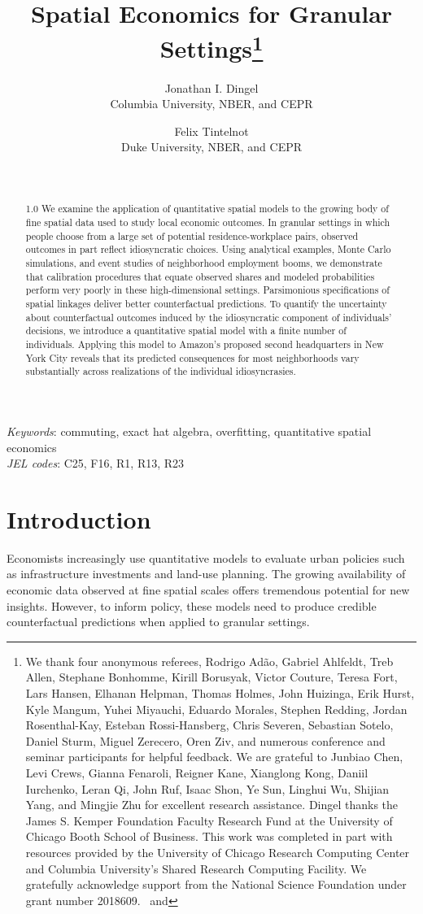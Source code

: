 \documentclass[11pt]{article}
\title{Spatial Economics for Granular Settings\thanks{
	We thank four anonymous referees,
	Rodrigo Ad\~{a}o, Gabriel Ahlfeldt, Treb Allen, Stephane Bonhomme, Kirill Borusyak, Victor Couture, Teresa Fort, Lars Hansen, Elhanan Helpman, Thomas Holmes, John Huizinga, Erik Hurst, Kyle Mangum, Yuhei Miyauchi, Eduardo Morales, Stephen Redding, Jordan Rosenthal-Kay, Esteban Rossi-Hansberg, Chris Severen, Sebastian Sotelo, Daniel Sturm, Miguel Zerecero, Oren Ziv, and
	numerous conference and seminar participants for helpful feedback.
	We are grateful to Junbiao Chen, Levi Crews, Gianna Fenaroli, Reigner Kane, Xianglong Kong, Daniil Iurchenko, Leran Qi, John Ruf, Isaac Shon, Ye Sun, Linghui Wu, Shijian Yang, and Mingjie Zhu for excellent research assistance.
	Dingel thanks the James S. Kemper Foundation Faculty Research Fund at the University of Chicago Booth School of Business.
	This work was completed in part with resources provided by the University of Chicago Research Computing Center
	and Columbia University's Shared Research Computing Facility.
	We gratefully acknowledge support from the National Science Foundation under grant number 2018609.
	\dingelemail \ and \tintelnotemail
}}
\author{Jonathan I. Dingel
\\ Columbia University, NBER, and CEPR
\and
Felix Tintelnot
\\ Duke University, NBER, and CEPR}
\date{\the\day \ \monthname[\the\month] \the\year}
\theoremstyle{definition}
\begin{document}
\maketitle 


\begin{abstract}
\begin{spacing}{1.0}
We examine the application of quantitative spatial models to the growing body of fine spatial data used to study local economic outcomes.
In granular settings in which people choose from a large set of potential residence-workplace pairs,
observed outcomes in part reflect idiosyncratic choices.
Using analytical examples, Monte Carlo simulations, and event studies of neighborhood employment booms,
we demonstrate that calibration procedures that equate observed shares and modeled probabilities perform very poorly in these high-dimensional settings.
Parsimonious specifications of spatial linkages deliver better counterfactual predictions.
To quantify the uncertainty about counterfactual outcomes induced by the idiosyncratic component of individuals' decisions,
we introduce a quantitative spatial model with a finite number of individuals.
Applying this model to Amazon's proposed second headquarters in New York City reveals that its predicted consequences for most neighborhoods
vary substantially across realizations of the individual idiosyncrasies.
\end{spacing}
\end{abstract}
\vspace{1cm}
{\small
\noindent \textit{Keywords}: commuting, exact hat algebra, overfitting, quantitative spatial economics \\
\textit{JEL codes}: C25, F16, R1, R13, R23 
}
\thispagestyle{empty}
\newpage
\setcounter{page}{1}


\section{Introduction}\label{sec:intro}

Economists increasingly use quantitative models to evaluate urban policies
such as infrastructure investments and land-use planning.
The growing availability of economic data observed at fine spatial scales offers tremendous potential for new insights.
However, to inform policy,
these models need to produce credible counterfactual predictions when applied to granular settings.
\end{document}
